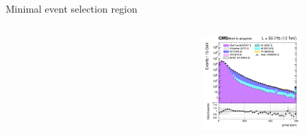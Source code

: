\documentclass[8pt]{beamer}
\begin{document}
\begin{frame}{Minimal event selection region}
\begin{columns}
\begin{column}{0.33\textwidth}
\begin{center}
    		\end{center}		
		\end{column}
		\begin{column}{0.33\textwidth}
			\begin{center}
     			\includegraphics[width=1.0\textwidth, height=100pt]{figs/2018/log_cratio_inclusiveCR_ll_METcorrected_pt.png}
    		\end{center}		
		\end{column}
\end{columns} \vfill
\end{frame}
\end{document}
